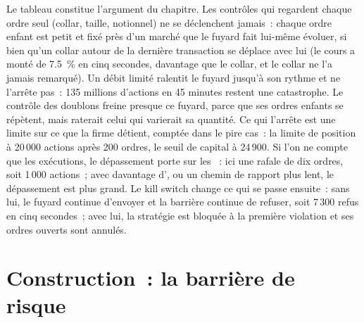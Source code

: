 Le tableau constitue l'argument du chapitre. Les contrôles qui regardent chaque ordre seul (collar, taille, notionnel) ne se déclenchent jamais~: chaque ordre enfant
est petit et fixé près d'un marché que le fuyard fait lui-même évoluer, si bien qu'un collar autour de la dernière transaction se déplace avec lui
(le cours a monté de 7.5~\% en cinq secondes, davantage que le collar, et le collar ne l'a jamais remarqué). Un débit limité ralentit le fuyard jusqu'à
son rythme et ne l'arrête pas~: 135 millions d'actions en 45 minutes restent une catastrophe. Le contrôle des doublons freine presque ce
fuyard, parce que ses ordres enfants se répètent, mais raterait celui qui varierait sa quantité. Ce qui l'arrête est une limite sur ce que la
firme détient, comptée dans le pire cas~: la limite de position à 20\,000 actions après 200 ordres, le seuil de capital à
24\,900. Si l'on ne compte que les exécutions, le dépassement porte sur les ~: ici une rafale de dix ordres, soit 1\,000 actions~; avec davantage d',
ou un chemin de rapport plus lent, le dépassement est plus grand. Le kill switch change ce qui se passe ensuite~: sans lui, le fuyard
continue d'envoyer et la barrière continue de refuser, soit 7\,300 refus en cinq secondes~; avec lui, la stratégie est bloquée à la première
violation et ses ordres ouverts sont annulés.

\section{Construction~: la barrière de risque}\label{bld:ll:pre-trade-risk-and-kill-switches:riskgate}


